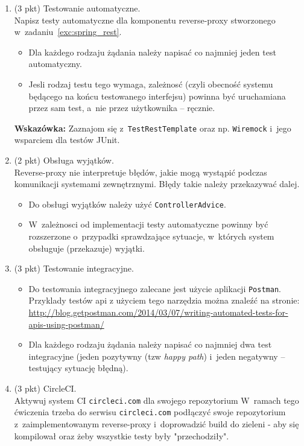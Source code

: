 \documentclass[12pt]{article}
\begin{document}
\begin{enumerate}
        \item\label{exc:spring_rest_test}
            (3 pkt) Testowanie automatyczne.\\
            Napisz testy automatyczne dla komponentu reverse-proxy stworzonego w~zadaniu~\ref{exc:spring_rest}.
            \begin{itemize}
                \item Dla każdego rodzaju żądania należy napisać co najmniej jeden test automatyczny.
                \item Jesli rodzaj testu tego wymaga, zależnosć (czyli obecność systemu będącego na końcu testowanego interfejsu) powinna być uruchamiana przez sam test, a~nie przez użytkownika -- ręcznie.
            \end{itemize}

            \textbf{Wskazówka:} Zaznajom się z~\texttt{TestRestTemplate} oraz np. \texttt{Wiremock} i~jego wsparciem dla testów JUnit.

        \item\label{exc:spring_exception_handling}
            (2 pkt) Obsługa wyjątków.\\
            Reverse-proxy nie interpretuje błędów, jakie mogą wystąpić podczas komunikacji systemami zewnętrznymi. Błędy takie należy przekazywać dalej.
            \begin{itemize}
                \item Do obsługi wyjątków należy użyć \texttt{ControllerAdvice}.
                \item W~zależnosci od implementacji testy automatyczne powinny być rozszerzone o~przypadki sprawdzające sytuacje, w~których system obsługuje (przekazuje) wyjątki.
            \end{itemize}

        \item\label{exc:postman}
            (3 pkt) Testowanie integracyjne.\\
            \begin{itemize}
                \item Do testowania integracyjnego zalecane jest użycie aplikacji \texttt{Postman}. Przyklady testów api z użyciem tego narzędzia można znaleźć na stronie: \\\url{http://blog.getpostman.com/2014/03/07/writing-automated-tests-for-apis-using-postman/}
                \item Dla każdego rodzaju żądania należy napisać co najmniej dwa test integracyjne (jeden pozytywny (tzw \emph{happy path}) i~jeden negatywny -- testujący sytuację błędną).
            \end{itemize}

        \item\label{exc:travis}
            (3 pkt) CircleCI.\\
            Aktywuj system CI \texttt{circleci.com} dla swojego repozytorium
            W~ramach tego ćwiczenia trzeba do serwisu \texttt{circleci.com} podłączyć swoje repozytorium z~zaimplementowanym reverse-proxy i~doprowadzić build do zieleni - aby się kompilował oraz żeby wszystkie testy były "przechodziły".
    \end{enumerate}
\end{document}
